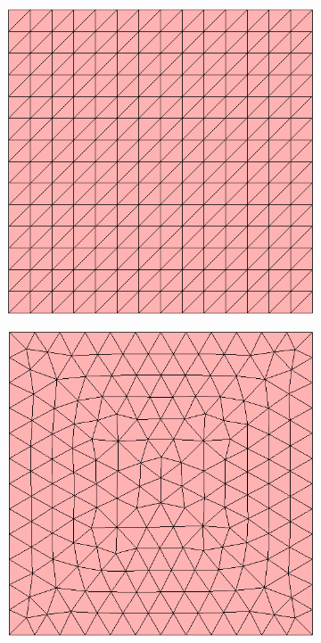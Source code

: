 %
\begin{figure}[htbp]
\centering
  \begin{subfigure}[t]{0.25\textwidth}
    \centering
	\includegraphics[width=\textwidth]{Chapter1/Graphics/mesh_iso_homo_struct.png}
	\caption{}
    \label{fig:mesh_iso_homo_struct}
  \end{subfigure}
   \begin{subfigure}[t]{0.25\textwidth}
    \centering
	\includegraphics[width=\textwidth]{Chapter1/Graphics/mesh_iso_homo_unstruct.png}

\end{subfigure}
\end{figure}
